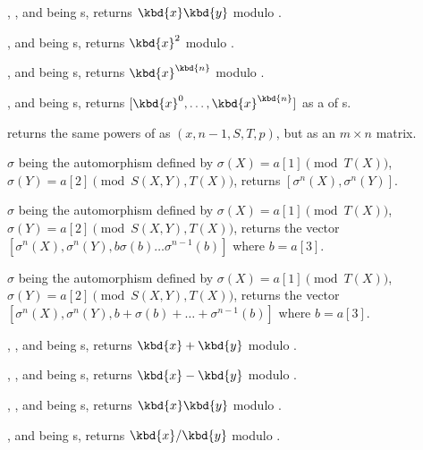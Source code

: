 , ,  and
 being s, returns $\kbd{x}\*\kbd{y}$ modulo .

,  and
 being s, returns $\kbd{x}^2$ modulo .

,  and
 being s, returns $\kbd{x}^\kbd{n}$ modulo .

,  and
 being s, returns $[\kbd{x}^0, \dots, \kbd{x}^\kbd{n}]$ as a
 of s.

returns the same powers of  as $(x, n-1,S, T, p)$,
but as an $m\times n$ matrix.

$\sigma$ being the automorphism defined by $\sigma(X)=a[1]\pmod{T(X)}$,
$\sigma(Y)=a[2]\pmod{S(X,Y),T(X)}$, returns $[\sigma^n(X),\sigma^n(Y)]$.

$\sigma$ being the automorphism defined by $\sigma(X)=a[1]\pmod{T(X)}$,
$\sigma(Y)=a[2]\pmod{S(X,Y),T(X)}$, returns the vector
$[\sigma^n(X),\sigma^n(Y),b\sigma(b)\ldots\sigma^{n-1}(b)]$
where $b=a[3]$.

$\sigma$ being the automorphism defined by $\sigma(X)=a[1]\pmod{T(X)}$,
$\sigma(Y)=a[2]\pmod{S(X,Y),T(X)}$, returns the vector
$[\sigma^n(X),\sigma^n(Y),b+\sigma(b)+\ldots+\sigma^{n-1}(b)]$
where $b=a[3]$.


, ,  and
 being s, returns $\kbd{x} + \kbd{y}$ modulo .

, ,  and
 being s, returns $\kbd{x} - \kbd{y}$ modulo .

, ,  and
 being s, returns $\kbd{x}\*\kbd{y}$ modulo .

,  and
 being s, returns $\kbd{x}/\kbd{y}$ modulo .

